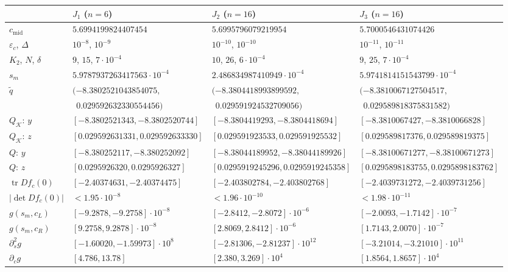 \documentclass[11pt]{amsart}
\theoremstyle{definition}
\theoremstyle{remark}
\newcommand{\cmid}{c_{\mathrm{mid}}}
\newcommand{\Kr}{\mathcal{K}}
\begin{document}
\begin{table}[t]
\centering
\scriptsize
\setlength{\tabcolsep}{2.4pt}
\begin{tabular}{@{}llll@{}}
\toprule
& $J_1$ ($n=6$) & $J_2$ ($n=16$) & $J_3$ ($n=16$)\\
\midrule
$\cmid$ & $5.6994199824407454$ & $5.6995796079219954$ & $5.7000546431074426$\\
$\varepsilon_c$, $\Delta$ & $10^{-8}$, $10^{-9}$ & $10^{-10}$, $10^{-10}$ & $10^{-11}$, $10^{-11}$\\
$K_2$, $N$, $\delta$ & $9$, $15$, $7\cdot10^{-4}$ & $10$, $26$, $6\cdot10^{-4}$ & $9$, $25$, $7\cdot10^{-4}$\\
$s_m$ & $5.9787937263417563\cdot10^{-4}$ & $2.486834987410949\cdot10^{-4}$ & $5.9741814151543799\cdot10^{-4}$\\
$\tilde q$ & $(-8.3802521043854075,$ & $(-8.3804418993899592,$ & $(-8.3810067127504517,$\\
& $\ \ 0.029592632330554456)$ & $\ \ 0.029591924532709056)$ & $\ \ 0.029589818375831582)$\\
$Q_\Kr$: $y$ & $[-8.3802521343,-8.3802520744]$ & $[-8.3804419293,-8.3804418694]$ & $[-8.3810067427,-8.3810066828]$\\
$Q_\Kr$: $z$ & $[0.029592631331,0.029592633330]$ & $[0.029591923533,0.029591925532]$ & $[0.029589817376,0.029589819375]$\\
$Q$: $y$ & $[-8.380252117,-8.380252092]$ & $[-8.38044189952,-8.38044189926]$ & $[-8.38100671277,-8.38100671273]$\\
$Q$: $z$ & $[0.0295926320,0.0295926327]$ & $[0.0295919245296,0.0295919245358]$ & $[0.0295898183755,0.0295898183762]$\\
$\operatorname{tr}Df_c(0)$ & $[-2.40374631,-2.40374475]$ & $[-2.403802784,-2.403802768]$ & $[-2.4039731272,-2.4039731256]$\\
$|\det Df_c(0)|$ & $<1.95\cdot10^{-8}$ & $<1.96\cdot10^{-10}$ & $<1.98\cdot10^{-11}$\\
$g(s_m,c_L)$ & $[-9.2878,-9.2758]\cdot10^{-8}$ & $[-2.8412,-2.8072]\cdot10^{-6}$ & $[-2.0093,-1.7142]\cdot10^{-7}$\\
$g(s_m,c_R)$ & $[9.2758,9.2878]\cdot10^{-8}$ & $[2.8069,2.8412]\cdot10^{-6}$ & $[1.7143,2.0070]\cdot10^{-7}$\\
$\partial_s^2g$ & $[-1.60020,-1.59973]\cdot10^{8}$ & $[-2.81306,-2.81237]\cdot10^{12}$ & $[-3.21014,-3.21010]\cdot10^{11}$\\
$\partial_cg$ & $[4.786,13.78]$ & $[2.380,3.269]\cdot10^{4}$ & $[1.8564,1.8657]\cdot10^{4}$\\

\end{tabular}
\end{table}
\end{document}
